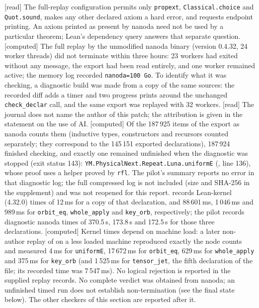 \documentclass[11pt,a4paper]{article}
\theoremstyle{plain}
\theoremstyle{definition}
\theoremstyle{remark}
\numberwithin{equation}{section}
\newcommand{\st}[1]{\textsf{[#1]}}
\begin{document}
\st{read} The full-replay configuration permits only \texttt{propext}, \texttt{Classical.choice} and
\texttt{Quot.sound}, makes any other declared axiom a hard error, and requests endpoint printing.
An axiom printed as present by nanoda need not be used by a particular theorem; Lean's dependency query
answers that separate question.
\st{computed} The full replay by the unmodified nanoda binary (version 0.4.32, 24 worker threads) did not terminate
within three hours: 23 workers had exited without any message, the export had been read entirely, and one worker
remained active; the memory log recorded \texttt{nanoda=100 Go}. To identify what it was checking, a diagnostic build was
made from a copy of the same sources: the recorded diff adds a timer and two progress prints around the unchanged
\texttt{check\_declar} call, and the same export was replayed with 32 workers. \st{read} The journal does not name the author of this patch; the attribution is given in the statement on the use of AI.
\st{computed} Of the 187\,925 items of the export as nanoda counts them (inductive
types, constructors and recursors counted separately; they correspond to the 145\,151 exported declarations),
187\,924 finished checking, and exactly one remained unfinished when the diagnostic was stopped (exit status 143):
\texttt{YM.PhysicalNext.Repeat.Luna.uniformE} (, line 136), whose proof uses a helper
proved by \texttt{rfl}. The pilot's summary reports no error in that diagnostic log; the full compressed log is not included (size and SHA-256 in the supplement) and was not reopened for this report.
 records Lean-kernel (4.32.0) times of 12\,ms for a copy of that declaration, and 88\,601\,ms,
1\,046\,ms and 989\,ms for \texttt{orbit\_eq}, \texttt{whole\_apply} and \texttt{key\_orb}, respectively;
the pilot records diagnostic nanoda times of 370.5\,s, 173.8\,s and 172.5\,s for those three declarations.
\st{computed} Kernel times depend on machine load: a later non-author replay of  on a less loaded machine
reproduced exactly the node counts and measured 4\,ms for \texttt{uniformE}, 17\,672\,ms for \texttt{orbit\_eq}, 629\,ms for
\texttt{whole\_apply} and 375\,ms for \texttt{key\_orb} (and 1\,525\,ms for \texttt{tensor\_jet}, the fifth declaration of the
file; its recorded time was 7\,547\,ms).
No logical rejection is reported in the supplied replay records. No complete verdict was obtained from nanoda;
an unfinished timed run does not establish non-termination (see the final state below). The other checkers of this section are reported after it.
\end{document}
